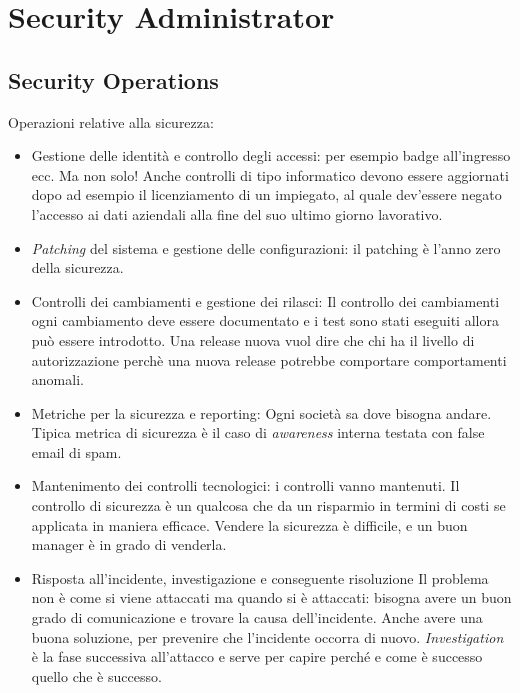 
\chapter{Security Administrator}

\section{Security Operations}

Operazioni relative alla sicurezza:
\begin{itemize}
\item Gestione delle identità e controllo degli accessi: per esempio badge 
all'ingresso ecc. Ma non solo! Anche controlli di tipo informatico devono essere 
aggiornati dopo ad esempio il licenziamento di un impiegato, al quale dev'essere 
negato l'accesso ai dati aziendali alla fine del suo ultimo giorno lavorativo.
\item \textit{Patching} del sistema e gestione delle configurazioni: il patching 
è l'anno zero della sicurezza.
\item Controlli dei cambiamenti e gestione dei rilasci: Il controllo dei 
cambiamenti ogni cambiamento deve essere documentato e i test sono stati 
eseguiti allora può essere introdotto.
Una release nuova vuol dire che chi ha il livello di autorizzazione perchè una 
nuova release potrebbe comportare comportamenti anomali.
\item Metriche per la sicurezza e reporting: Ogni società sa dove bisogna 
andare. Tipica metrica di sicurezza è il caso di \emph{awareness} interna 
testata con false email di spam. 
\item Mantenimento dei controlli tecnologici: i controlli vanno mantenuti. 
Il controllo di sicurezza è un qualcosa che da un risparmio in termini di costi 
se applicata in maniera efficace. Vendere la sicurezza è difficile, e un buon 
manager è in grado di venderla.

\item Risposta all'incidente, investigazione e conseguente risoluzione
Il problema non è come si viene attaccati ma quando si è attaccati: bisogna 
avere un buon grado di comunicazione e trovare la causa dell'incidente. Anche 
avere una buona soluzione, per prevenire che l'incidente occorra di nuovo.
\textit{Investigation} è la fase successiva all'attacco e serve per capire 
perché e come è successo quello che è successo.

\end{itemize}

